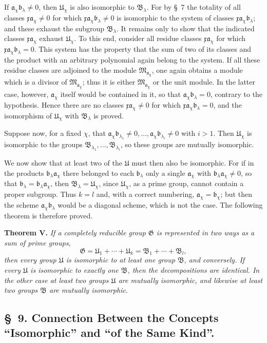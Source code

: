\documentclass[11pt]{article}
\newcommand{\mM}{\mathfrak{M}}
\newcommand{\mG}{\mathfrak{G}}
\newcommand{\mB}{\mathfrak{B}}
\newcommand{\ma}{\mathfrak{a}}
\newcommand{\mb}{\mathfrak{b}}
\newcommand{\mx}{\mathfrak{x}}
\providecommand{\mU}{\mathfrak{U}}
\begin{document}
If $\ma_\chi\mb_\lambda\ne0$, then $\mU_\chi$ is also isomorphic to $\mB_\lambda$. For by \S~7 the totality of all classes $\mx\ma_\chi\ne0$ for which $\mx\ma_\chi\mb_\lambda\ne0$ is isomorphic to the system of classes $\mx\ma_\chi\mb_\lambda$; and these exhaust the subgroup $\mB_\lambda$. It remains only to show that the indicated classes $\mx\ma_\chi$ exhaust $\mU_\chi$. To this end, consider all residue classes $\mx\ma_\chi$ for which $\mx\ma_\chi\mb_\lambda=0$. This system has the property that the sum of two of its classes and the product with an arbitrary polynomial again belong to the system. If all these residue classes are adjoined to the module $\mM_{\ma_\chi}$, one again obtains a module which is a divisor of $\mM_{\ma_\chi}$; thus it is either $\mM_{\ma_\chi}$ or the unit module. In the latter case, however, $\ma_\chi$ itself would be contained in it, so that $\ma_\chi\mb_\lambda=0$, contrary to the hypothesis. Hence there are no classes $\mx\ma_\chi\ne0$ for which $\mx\ma_\chi\mb_\lambda=0$, and the isomorphism of $\mU_\chi$ with $\mB_\lambda$ is proved.

Suppose now, for a fixed $\chi$, that $\ma_\chi\mb_{\lambda_1}\ne0,
\ldots,\ma_\chi\mb_{\lambda_i}\ne0$ with $i>1$. Then $\mU_\chi$ is isomorphic to the groups $\mB_{\lambda_1},\ldots,\mB_{\lambda_i}$, so these groups are mutually isomorphic.

We now show that at least two of the $\mU$ must then also be isomorphic. For if in the products $\mb_\lambda\ma_\chi$ there belonged to each $\mb_\lambda$ only a single $\ma_\chi$ with $\mb_\lambda\ma_\chi\ne0$, so that $\mb_\lambda=\mb_\lambda\ma_\chi$, then $\mB_\lambda=\mU_\chi$, since $\mU_\chi$, as a prime group, cannot contain a proper subgroup. Thus $k=l$ and, with a correct numbering, $\ma_\chi=\mb_\chi$; but then the scheme $\ma_\chi\mb_\lambda$ would be a diagonal scheme, which is not the case. The following theorem is therefore proved.

\textbf{Theorem V.} \emph{If a completely reducible group $\mG$ is represented in two ways as a sum of prime groups,
\[
 \mG=\mU_1+\cdots+\mU_k=\mB_1+\cdots+\mB_l,
\]
then every group $\mU$ is isomorphic to at least one group $\mB$, and conversely. If every $\mU$ is isomorphic to exactly one $\mB$, then the decompositions are identical. In the other case at least two groups $\mU$ are mutually isomorphic, and likewise at least two groups $\mB$ are mutually isomorphic.}

\subsection*{\S~9. Connection Between the Concepts ``Isomorphic'' and ``of the Same Kind''.}
\end{document}
